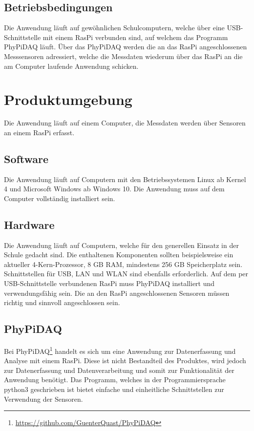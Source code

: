 \documentclass[parskip=full]{scrartcl}
\begin{document}
\subsection{Betriebsbedingungen}

Die Anwendung läuft auf gewöhnlichen Schulcomputern, welche über eine USB-Schnittstelle mit einem \gls{RasPi} verbunden sind, auf welchem das Programm \gls{PhyPiDAQ} läuft. Über das \gls{PhyPiDAQ} werden die an das \gls{RasPi} angeschlossenen Messsensoren adressiert, welche die Messdaten wiederum über das \gls{RasPi} an die am Computer laufende Anwendung schicken. 


\section{Produktumgebung}\label{produktumgebung}

Die Anwendung läuft auf einem Computer, die Messdaten werden über Sensoren an einem \gls{RasPi} erfasst.

\subsection{Software}

Die Anwendung läuft auf Computern mit den Betriebssystemen Linux ab Kernel 4 und Microsoft Windows ab Windows 10. Die Anwendung muss auf dem Computer vollständig installiert sein. 

\subsection{Hardware}

Die Anwendung läuft auf Computern, welche für den generellen Einsatz in der Schule gedacht sind.
Die enthaltenen Komponenten sollten beispielsweise ein aktueller 4-Kern-Prozessor, 8 GB RAM,
mindestens 256 GB Speicherplatz sein. Schnittstellen für USB, LAN und WLAN sind ebenfalls erforderlich. 
Auf dem per USB-Schnittstelle verbundenen \gls{RasPi} muss \gls{PhyPiDAQ} installiert und verwendungsfähig sein.
Die an den \gls{RasPi} angeschlossenen Sensoren müssen richtig und sinnvoll angeschlossen sein.

\subsection{PhyPiDAQ}

Bei PhyPiDAQ\footnote{\url{https://github.com/GuenterQuast/PhyPiDAQ}} handelt es sich um eine Anwendung zur Datenerfassung und Analyse mit einem \gls{RasPi}. Diese ist nicht Bestandteil des Produktes, wird jedoch zur Datenerfassung und Datenverarbeitung und somit zur Funktionalität der Anwendung  benötigt. Das Programm, welches in der Programmiersprache \gls{python3} geschrieben ist bietet einfache und einheitliche Schnittstellen zur Verwendung der Sensoren.
\end{document}
